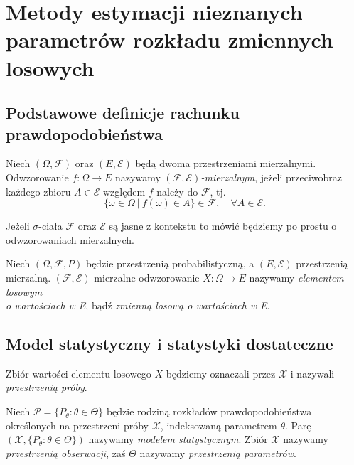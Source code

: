 \chapter{Metody estymacji nieznanych parametrów rozkładu zmiennych losowych}
\section{Podstawowe definicje rachunku prawdopodobieństwa}
	\begin{df}
		Niech $(\Omega, \mathcal{F})$ oraz $(E, \mathcal{E})$ będą dwoma przestrzeniami mierzalnymi. Odwzorowanie $f: \Omega \rightarrow E$ nazywamy \textit{$(\mathcal{F}, \mathcal{E})$-mierzalnym}, jeżeli przeciwobraz każdego zbioru $A \in \mathcal{E}$ względem $f$ należy do $\mathcal{F}$, tj.
		\[
		\{ \omega \in \Omega \:| \: f(\omega) \in A\} \in \mathcal{F}, \quad \forall A \in \mathcal{E}.
		\]
	\end{df}
		
	\begin{uwg}
		Jeżeli $\sigma$-ciała $\mathcal{F}$ oraz $\mathcal{E}$ są jasne z kontekstu to mówić będziemy po prostu o odwzorowaniach mierzalnych.
	\end{uwg}	
		
	\begin{df}\label{df:random-element}
		Niech $(\Omega, \mathcal{F}, P)$ będzie przestrzenią probabilistyczną, a  $(E, \mathcal{E})$ przestrzenią mierzalną. 
		$(\mathcal{F}, \mathcal{E})$-mierzalne odwzorowanie $X:\Omega\rightarrow E$ nazywamy \textit{elementem losowym\\ o wartościach w E}, bądź \textit{zmienną losową o wartościach w E}.
	\end{df}	

\section{Model statystyczny i statystyki dostateczne}

\begin{df}
	Zbiór wartości elementu losowego $X$ będziemy oznaczali przez $\mathcal{X}$ i nazywali \textit{przestrzenią próby}. 	
\end{df}

\begin{df}
	Niech $\mathcal{P}=\{P_\theta : \theta \in \Theta\}$ będzie rodziną rozkładów prawdopodobieństwa określonych na przestrzeni próby $\mathcal{X}$, indeksowaną parametrem $\theta$. Parę $(\mathcal{X},\{P_\theta \colon \theta \in \Theta\})$ nazywamy \textit{modelem statystycznym}. Zbiór $\mathcal{X}$	nazywamy \textit{przestrzenią obserwacji}, zaś $\Theta$ nazywamy \textit{przestrzenią parametrów}.
\end{df}

